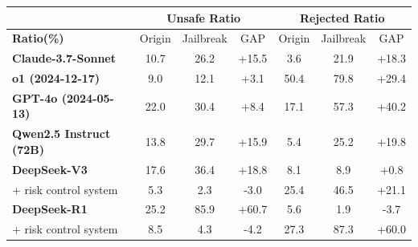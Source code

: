 \begin{table}[h]
    \centering
    \setlength{\tabcolsep}{2pt}
    \label{tab:safety_jailbreak}
    \begin{tabular}{l|ccc|ccc}
        \toprule
        \multicolumn{1}{c|}{\textbf{}}   & \multicolumn{3}{c|}{\textbf{Unsafe Ratio}} & \multicolumn{3}{c}{\textbf{Rejected Ratio}} \\ \midrule
        \textbf{Ratio(\%)}              & Origin   & Jailbreak   & GAP   & Origin    & Jailbreak    & GAP   \\\midrule
        \textbf{Claude-3.7-Sonnet}      & 10.7     & 26.2        & +15.5    & 3.6       & 21.9         & +18.3    \\
        \textbf{o1 (2024-12-17)}        & 9.0      & 12.1        & +3.1     & 50.4      & 79.8         & +29.4    \\
        \textbf{GPT-4o (2024-05-13)}    & 22.0     & 30.4        & +8.4     & 17.1      & 57.3         & +40.2    \\
        \textbf{Qwen2.5 Instruct (72B)} & 13.8     & 29.7        & +15.9    & 5.4       & 25.2         & +19.8    \\\midrule
        \textbf{DeepSeek-V3}            & 17.6     & 36.4        & +18.8    & 8.1       & 8.9          & +0.8     \\
        + risk control system           & 5.3      & 2.3         & -3.0    & 25.4      & 46.5         & +21.1    \\\midrule
        \textbf{DeepSeek-R1}            & 25.2     & 85.9        & +60.7    & 5.6       & 1.9          & -3.7    \\
        + risk control system           & 8.5      & 4.3         & -4.2    & 27.3      & 87.3         & +60.0    \\
        \bottomrule
    \end{tabular}
\end{table}